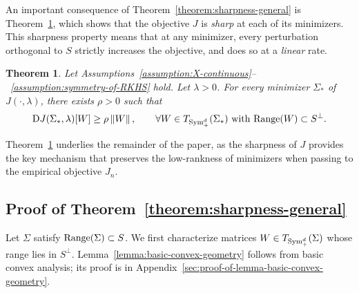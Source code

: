 \documentclass[sn-mathphys-num]{sn-jnl}%
\numberwithin{equation}{section}
\newcommand{\norm}[1]{\left\|{#1}\right\|} %
\newcommand{\Range}{{\rm Range}}
\newcommand{\Sym}{{\rm \mathrm{Sym}}}
\theoremstyle{thmstyleone}%
\newtheorem{theorem}{Theorem}%
\theoremstyle{thmstyletwo}%
\theoremstyle{thmstylethree}%
\begin{document}
\vspace{.5em} 
An important consequence of Theorem~\ref{theorem:sharpness-general} is 
Theorem~\ref{theorem:sharpness}, which shows that the objective 
$J$ is \emph{sharp} at each of its minimizers. This sharpness property means that 
at any minimizer, every perturbation orthogonal to $S$ strictly increases the objective, and does so at a \emph{linear} rate. 


\vspace{.5em} 
\begin{theorem}
\label{theorem:sharpness}
Let Assumptions~\ref{assumption:X-continuous}--~\ref{assumption:symmetry-of-RKHS} 
hold. Let $\lambda > 0$. For every minimizer $\Sigma_*$ of $J(\cdot,\lambda)$,
there exists $\rho > 0$ such that
\begin{equation*}
	\mathrm{D} J(\Sigma_*, \lambda)[W] \ge \rho \norm{W}, \qquad \forall W \in T_{\Sym_+^d}(\Sigma_*)~\text{with}~ \Range(W) \subset S^\perp.
\end{equation*}
\end{theorem} 

Theorem~\ref{theorem:sharpness} underlies the remainder of the paper, as the sharpness of $J$ provides the key 
mechanism that preserves the low-rankness of minimizers when passing to the empirical objective $J_n$.






\subsection{Proof of Theorem~\ref{theorem:sharpness-general}}
\label{sec:proof-of-theorem-sharpness-general}

\indent\indent
Let $\Sigma$ satisfy $\Range(\Sigma) \subset S$.
We first characterize matrices $W \in T_{\Sym_+^d}(\Sigma)$ whose range lies in $S^\perp$.
Lemma~\ref{lemma:basic-convex-geometry} follows from basic convex analysis; its proof is in Appendix~\ref{sec:proof-of-lemma-basic-convex-geometry}.
\end{document}
